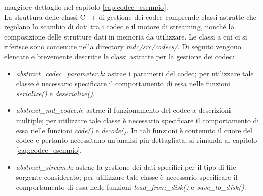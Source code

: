 maggiore dettaglio nel capitolo \ref{cap:codec_esempio}.
\\
La struttura delle classi C++ di gestione dei codec comprende classi astratte
che regolano lo scambio di dati tra i codec e il motore di streaming, nonché la
composizione delle strutture dati in memoria da utilizzare. Le classi a cui ci si riferisce sono contenute nella directory \textit{mdc/src/codecs/}. Di
seguito vengono elencate e brevemente descritte le classi astratte per la
gestione dei codec:
\begin{itemize}
 \item \textit{abstract\_codec\_parameter.h}: astrae i parametri del codec; per
 utilizzare tale classe è necessario specificare il comportamento di essa nelle
 funzioni \textit{serialize()} e \textit{deserialize()}.
 \item \textit{abstract\_md\_codec.h}: astrae il funzionamento del codec a
 descrizioni multiple; per utilizzare tale classe è necessario specificare il
 comportamento di essa nelle funzioni \textit{code()} e \textit{decode()}. In
 tali funzioni è contenuto il cuore del codec e pertanto necessitano un'analisi
 più dettagliata, si rimanda al capitolo \ref{cap:codec_esempio}.
 \item \textit{abstract\_stream.h}: astrae la gestione dei dati specifici per il
 tipo di file sorgente considerato; per utilizzare tale classe è necessario
 specificare il comportamento di essa nelle funzioni \textit{load\_from\_disk()}
 e \textit{save\_to\_disk()}.
\end{itemize}